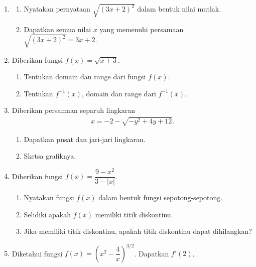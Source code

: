 \documentclass[10pt,openany,a4paper]{article}
\theoremstyle{definition}
\theoremstyle{definition}
\theoremstyle{plain}
\begin{document}
\newpage

\begin{enumerate}
    \item \begin{enumerate}
        \item Nyatakan pernyataan $\sqrt{(3x+2)^2}$ dalam bentuk nilai mutlak.
        \item Dapatkan semua nilai $x$ yang memenuhi persamaan $\sqrt{(3x+2)^2}=3x+2$.
    \end{enumerate}

    \item Diberikan fungsi $f(x)=\sqrt{x+3}$.
    \begin{enumerate}
        \item Tentukan domain dan range dari fungsi $f(x)$.
        \item Tentukan $f^{-1}(x)$, domain dan range dari $f^{-1}(x)$.
    \end{enumerate}

    \item Diberikan persamaan separuh lingkaran
    \begin{align*}
        x=-2-\sqrt{-y^2+4y+12}.
    \end{align*}
    \begin{enumerate}
        \item Dapatkan pusat dan jari-jari lingkaran.
        \item Sketsa grafiknya.
    \end{enumerate}

    \item Diberikan fungsi $f(x)=\dfrac{9-x^2}{3-|x|}$.
    \begin{enumerate}
        \item Nyatakan fungsi $f(x)$ dalam bentuk fungsi sepotong-sepotong.
        \item Selidiki apakah $f(x)$ memiliki titik diskontinu.
        \item Jika memiliki titik diskontinu, apakah titik diskontinu dapat dihilangkan?
    \end{enumerate}

    \item Diketahui fungsi $f(x)=\left(x^2-\dfrac{4}{x}\right)^{3/2}$. Dapatkan $f'(2)$.
\end{enumerate}
\end{document}
